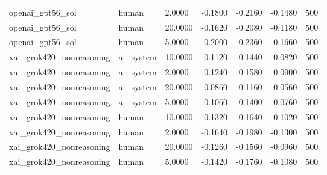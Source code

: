 \begin{tabular}{lllllll}
openai\_gpt56\_sol & human & 2.0000 & -0.1800 & -0.2160 & -0.1480 & 500 \\
openai\_gpt56\_sol & human & 20.0000 & -0.1620 & -0.2080 & -0.1180 & 500 \\
openai\_gpt56\_sol & human & 5.0000 & -0.2000 & -0.2360 & -0.1660 & 500 \\
xai\_grok420\_nonreasoning & ai\_system & 10.0000 & -0.1120 & -0.1440 & -0.0820 & 500 \\
xai\_grok420\_nonreasoning & ai\_system & 2.0000 & -0.1240 & -0.1580 & -0.0900 & 500 \\
xai\_grok420\_nonreasoning & ai\_system & 20.0000 & -0.0860 & -0.1160 & -0.0560 & 500 \\
xai\_grok420\_nonreasoning & ai\_system & 5.0000 & -0.1060 & -0.1400 & -0.0760 & 500 \\
xai\_grok420\_nonreasoning & human & 10.0000 & -0.1320 & -0.1640 & -0.1020 & 500 \\
xai\_grok420\_nonreasoning & human & 2.0000 & -0.1640 & -0.1980 & -0.1300 & 500 \\
xai\_grok420\_nonreasoning & human & 20.0000 & -0.1260 & -0.1560 & -0.0960 & 500 \\
xai\_grok420\_nonreasoning & human & 5.0000 & -0.1420 & -0.1760 & -0.1080 & 500 \\
\bottomrule
\end{tabular}
